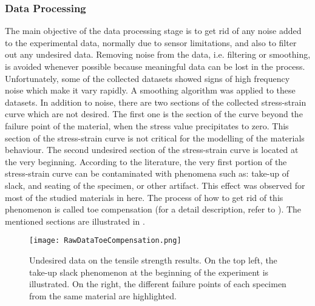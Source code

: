 \subsubsection{Data Processing}

The main objective of the data processing stage is to get rid of any noise added to the experimental data, normally due to sensor limitations, and also to filter out any undesired data. Removing noise from the data, i.e. filtering or smoothing, is avoided whenever possible because meaningful data can be lost in the process. Unfortunately, some of the collected datasets showed signs of high frequency noise which make it vary rapidly. A smoothing algorithm was applied to these datasets. In addition to noise, there are two sections of the collected stress-strain curve which are not desired. The first one is the section of the curve beyond the failure point of the material, when the stress value precipitates to zero. This section of the stress-strain curve is not critical for the modelling of the materials behaviour. The second undesired section of the stress-strain curve is located at the very beginning. According to the literature, the very first portion of the stress-strain curve can be contaminated with phenomena such as: take-up of slack, and seating of the specimen, or other artifact. This effect was observed for most of the studied materials in here. The process of how to get rid of this phenomenon is called toe compensation (for a detail description, refer to \cite{astmd638}). The mentioned sections are illustrated in .

\begin{figure}[htb!]
    \centering
    \texttt{[image: RawDataToeCompensation.png]}
    \caption{Undesired data on the tensile strength results. On the top left, the take-up slack phenomenon at the beginning of the experiment is illustrated. On the right, the different failure points of each specimen from the same material are highlighted.}
    \label{fig:rawData}
\end{figure}

